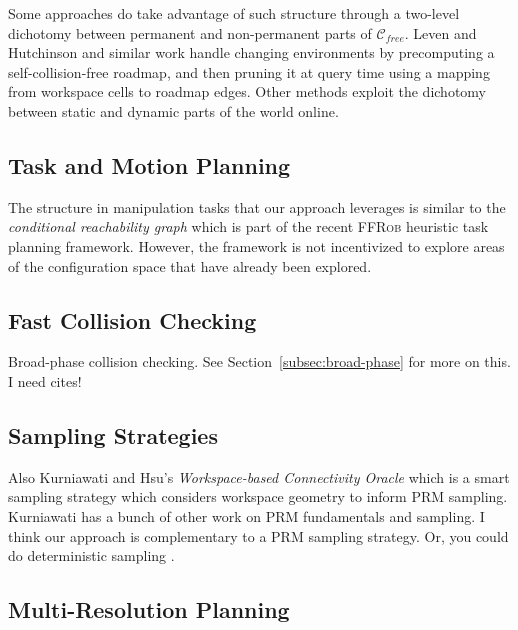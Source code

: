 \documentclass{report}
\begin{document}
Some approaches do take advantage of such structure
through a two-level dichotomy between
permanent and non-permanent parts of $\mathcal{C}_{free}$.
Leven and Hutchinson \cite{leven2000changing}
and similar work \cite{kallman2004dynamicroadmaps}
handle changing environments by
precomputing a self-collision-free roadmap,
and then pruning it at query time
using a mapping from workspace cells to roadmap edges.
Other methods \cite{jaillet2004dynamicprm}
exploit the dichotomy between static and dynamic parts of
the world online.

\subsection{Task and Motion Planning}

The structure in manipulation tasks that our approach leverages
is similar to the \emph{conditional reachability graph} which is
part of the recent \textsc{FFRob} heuristic task planning framework.
However, the framework is not incentivized to explore
areas of the configuration space that have already been explored.

\subsection{Fast Collision Checking}

Broad-phase collision checking.
See Section~\ref{subsec:broad-phase} for more on this.
I need cites!

\subsection{Sampling Strategies}

Also Kurniawati and Hsu's
\emph{Workspace-based Connectivity Oracle}
\cite{kurniawati2008workconnoracle}
which is a smart sampling strategy which considers workspace
geometry to inform PRM sampling.
Kurniawati has a bunch of other work on PRM fundamentals and sampling.
I think our approach is complementary to a PRM sampling strategy.
Or, you could do deterministic sampling
\cite{lavalle2002gridprms} \cite{geraerts2002prmcomparison}.

\subsection{Multi-Resolution Planning}
\end{document}
